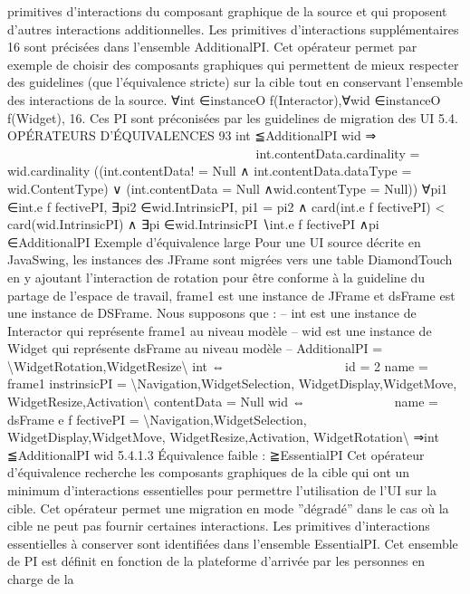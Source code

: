 \documentclass{article}
\begin{document}
primitives d’interactions du composant graphique de la source et qui proposent d’autres interactions additionnelles. Les primitives d’interactions suppl\'{e}mentaires 16 sont pr\'{e}cis\'{e}es dans l’ensemble
AdditionalPI. Cet op\'{e}rateur permet par exemple de choisir des composants graphiques qui permettent
de mieux respecter des guidelines (que l’\'{e}quivalence stricte) sur la cible tout en conservant l’ensemble
des interactions de la source.
∀int ∈instanceO f(Interactor),∀wid ∈instanceO f(Widget),
16. Ces PI sont pr\'{e}conis\'{e}es par les guidelines de migration des UI
5.4. OPÉRATEURS D’ÉQUIVALENCES
93
int ≦AdditionalPI wid ⇒











































int.contentData.cardinality = wid.cardinality
((int.contentData! = Null
∧
int.contentData.dataType = wid.ContentType)
∨
(int.contentData = Null ∧wid.contentType = Null))
∀pi1 ∈int.e f fectivePI,
∃pi2 ∈wid.IntrinsicPI,
pi1 = pi2
∧
card(int.e f fectivePI) < card(wid.IntrinsicPI)
∧
∃pi ∈wid.IntrinsicPI ∖int.e f fectivePI ∧pi ∈AdditionalPI
Exemple d’\'{e}quivalence large
Pour une UI source d\'{e}crite en JavaSwing, les instances des JFrame
sont migr\'{e}es vers une table DiamondTouch en y ajoutant l’interaction de rotation pour \^{e}tre conforme
\`{a} la guideline du partage de l’espace de travail, frame1 est une instance de JFrame et dsFrame est une
instance de DSFrame. Nous supposons que :
– int est une instance de Interactor qui repr\'{e}sente frame1 au niveau mod\`{e}le
– wid est une instance de Widget qui repr\'{e}sente dsFrame au niveau mod\`{e}le
– AdditionalPI = \textbackslash{}{WidgetRotation,WidgetResize\textbackslash{}}
int ⇔















id = 2
name = frame1
instrinsicPI = \textbackslash{}{Navigation,WidgetSelection,
WidgetDisplay,WidgetMove,
WidgetResize,Activation\textbackslash{}}
contentData = Null
wid ⇔











name = dsFrame
e f fectivePI = \textbackslash{}{Navigation,WidgetSelection,
WidgetDisplay,WidgetMove,
WidgetResize,Activation,
WidgetRotation\textbackslash{}}
⇒int ≦AdditionalPI wid
5.4.1.3
Équivalence faible : ≧EssentialPI
Cet op\'{e}rateur d’\'{e}quivalence recherche les composants graphiques de la cible qui ont un minimum
d’interactions essentielles pour permettre l’utilisation de l’UI sur la cible. Cet op\'{e}rateur permet une
migration en mode ”d\'{e}grad\'{e}” dans le cas o\`{u} la cible ne peut pas fournir certaines interactions. Les
primitives d’interactions essentielles \`{a} conserver sont identiﬁ\'{e}es dans l’ensemble EssentialPI. Cet
ensemble de PI est d\'{e}ﬁnit en fonction de la plateforme d’arriv\'{e}e par les personnes en charge de la
\end{document}
